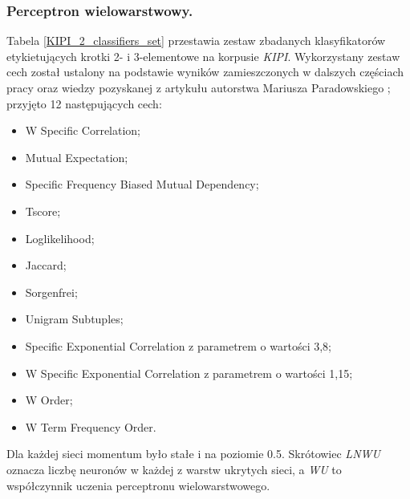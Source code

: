 \documentclass[11pt,a4paper]{llncs}
\begin{document}
\subsubsection{Perceptron wielowarstwowy.}
Tabela \ref{KIPI_2_classifiers_set} przestawia zestaw zbadanych klasyfikatorów etykietujących krotki 2- i 3-elementowe na korpusie \emph{KIPI}.
Wykorzystany zestaw cech został ustalony na podstawie wyników zamieszczonych w dalszych częściach pracy oraz wiedzy pozyskanej z artykułu autorstwa Mariusza Paradowskiego \cite{paradowski_beta}; przyjęto 12 następujących cech:
\begin{itemize}
	\item W Specific Correlation;
	\item Mutual Expectation;
	\item Specific Frequency Biased Mutual Dependency;
	\item Tscore;
	\item Loglikelihood;
	\item Jaccard;
	\item Sorgenfrei;
	\item Unigram Subtuples;
	\item Specific Exponential Correlation z parametrem o wartości 3,8;
	\item W Specific Exponential Correlation z parametrem o wartości 1,15;
	\item W Order;
	\item W Term Frequency Order.
\end{itemize}

Dla każdej sieci momentum było stałe i na poziomie 0.5.
Skrótowiec \emph{LNWU} oznacza liczbę neuronów w każdej z warstw ukrytych sieci, a \emph{WU} to współczynnik uczenia perceptronu wielowarstwowego.
\end{document}
